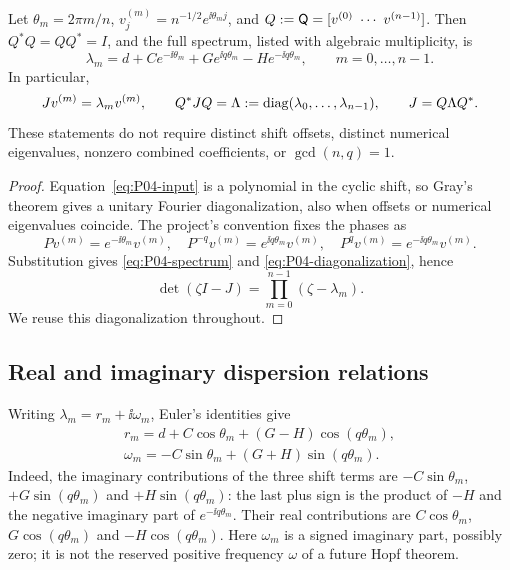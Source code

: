 \begin{theorem}
\label{thm:P04-spectrum}
Let $\theta_m=2\pi m/n$, $v^{(m)}_j=n^{-1/2}e^{\ii\theta_m j}$,
and $Q:=\Fourier=[v^{(0)}\ \cdots\ v^{(n-1)}]$.
Then $Q^*Q=QQ^*=I$, and the full spectrum, listed with algebraic
multiplicity, is
\begin{equation}
 \boxed{\lambda_m=d+Ce^{-\ii\theta_m}
                      +Ge^{\ii q\theta_m}-He^{-\ii q\theta_m},
           \qquad m=0,\ldots,n-1.}
 \label{eq:P04-spectrum}
\end{equation}
In particular,
\begin{equation}
 Jv^{(m)}=\lambda_m v^{(m)},\qquad
 Q^*JQ=\Lambda:=\operatorname{diag}(\lambda_0,\ldots,\lambda_{n-1}),\qquad
 J=Q\Lambda Q^*.
 \label{eq:P04-diagonalization}
\end{equation}
These statements do not require distinct shift offsets, distinct
numerical eigenvalues, nonzero combined coefficients, or
$\gcd(n,q)=1$.
\end{theorem}
\begin{proof}
Equation~\eqref{eq:P04-input} is a polynomial in the cyclic shift,
so Gray's theorem \cite[Theorem~3.1]{Gray2006} gives a unitary Fourier
diagonalization, also when offsets or numerical eigenvalues coincide.
The project's convention fixes the phases as
\begin{equation}
 Pv^{(m)}=e^{-\ii\theta_m}v^{(m)},\quad
 P^{-q}v^{(m)}=e^{\ii q\theta_m}v^{(m)},\quad
 P^qv^{(m)}=e^{-\ii q\theta_m}v^{(m)}.
 \label{eq:P04-shifts}
\end{equation}
Substitution gives \eqref{eq:P04-spectrum} and
\eqref{eq:P04-diagonalization}, hence
\begin{equation}
 \det(\zeta I-J)=\prod_{m=0}^{n-1}(\zeta-\lambda_m).
 \label{eq:P04-characteristic}
\end{equation}
We reuse this diagonalization throughout.
\end{proof}

\subsection{Real and imaginary dispersion relations}

Writing $\lambda_m=r_m+\ii\omega_m$, Euler's identities give
\begin{align}
 \boxed{r_m=d+C\cos\theta_m+(G-H)\cos(q\theta_m),}
   \label{eq:P04-real}\\
 \boxed{\omega_m=-C\sin\theta_m+(G+H)\sin(q\theta_m).}
   \label{eq:P04-imag}
\end{align}
Indeed, the imaginary contributions of the three shift terms are
$-C\sin\theta_m$, $+G\sin(q\theta_m)$ and
$+H\sin(q\theta_m)$: the last plus sign is the product of
$-H$ and the negative imaginary part of $e^{-\ii q\theta_m}$.
Their real contributions are $C\cos\theta_m$,
$G\cos(q\theta_m)$ and $-H\cos(q\theta_m)$.
Here $\omega_m$ is a signed imaginary part, possibly zero; it is not
the reserved positive frequency $\omega$ of a future Hopf theorem.

